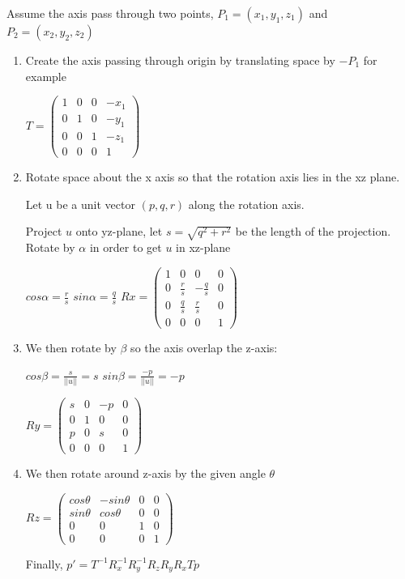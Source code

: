 \documentclass[12pt]{article}
\begin{document}
Assume the axis pass through two points, $P_1=(x_1, y_1, z_1)$ and $P_2=(x_2,y_2,z_2)$
\begin{enumerate}[(1)]

\item
Create the axis passing through origin by translating space by $-P_1$ for example

$ T = \begin{pmatrix}
1 & 0 & 0 & -x_1\\
0 & 1 & 0 & -y_1\\
0 & 0 & 1 & -z_1\\
0 & 0 & 0 & 1
\end{pmatrix}$

\item
Rotate space about the x axis so that the rotation axis lies in the xz plane.

Let u be a unit vector $(p,q,r)$ along the rotation axis. 

Project $u$ onto yz-plane, let $s=\sqrt{q^2+r^2}$ be the length of the projection. Rotate by $\alpha$ in order to get $u$ in xz-plane

$cos\alpha = \frac{r}{s} $ $sin\alpha = \frac{q}{s}$
$ Rx = \begin{pmatrix}
1 & 0 & 0 & 0\\
0 & \frac{r}{s} & -\frac{q}{s} & 0\\
0 & \frac{q}{s} & \frac{r}{s} & 0\\
0 & 0 & 0 & 1
\end{pmatrix}$

\item
We then rotate by $\beta$ so the axis overlap the z-axis:

$cos\beta = \frac{s}{||u||}= s$ $sin\beta = \frac{-p}{||u||} = -p $

$ Ry = \begin{pmatrix}
s & 0 & -p & 0\\
0 & 1 & 0 & 0\\
p & 0 & s & 0\\
0 & 0 & 0 & 1
\end{pmatrix}$

\item
We then rotate around z-axis by the given angle $\theta$

$ Rz = \begin{pmatrix}
cos\theta & -sin\theta & 0 & 0\\
sin\theta & cos\theta & 0 & 0\\
0 & 0 & 1 & 0\\
0 & 0 & 0 & 1
\end{pmatrix}$

Finally, $p'=T^{-1}R_x^{-1}R_y^{-1}R_zR_yR_xTp$
\end{enumerate}
\end{document}
